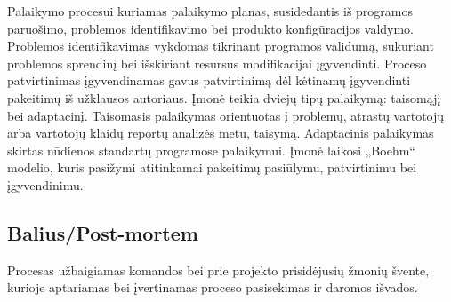 \documentclass{VUMIFPSkursinis}
\begin{document}
	Palaikymo procesui kuriamas palaikymo planas, susidedantis iš programos paruošimo, problemos identifikavimo bei produkto konfigūracijos valdymo. Problemos identifikavimas vykdomas tikrinant programos validumą, sukuriant problemos sprendinį bei išskiriant resursus modifikacijai įgyvendinti. Proceso patvirtinimas įgyvendinamas gavus patvirtinimą dėl kėtinamų įgyvendinti pakeitimų  iš užklausos autoriaus. Įmonė teikia dviejų tipų palaikymą: taisomąjį bei adaptacinį. Taisomasis palaikymas orientuotas į problemų, atrastų vartotojų arba vartotojų klaidų reportų analizės metu, taisymą. Adaptacinis palaikymas skirtas nūdienos standartų programose palaikymui. Įmonė laikosi „Boehm“ modelio, kuris pasižymi atitinkamai pakeitimų pasiūlymu, patvirtinimu bei įgyvendinimu.
	\label{img:boehmsModel} 

	\subsection{Balius/Post-mortem}
	Procesas užbaigiamas komandos bei prie projekto prisidėjusių žmonių švente, kurioje aptariamas bei įvertinamas proceso pasisekimas ir daromos išvados.
\end{document}
